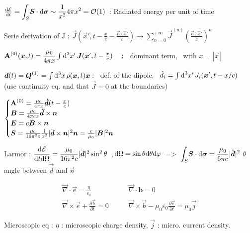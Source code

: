 \item $ \frac{\ud \E}{\ud t} = \displaystyle{\int_{S}} \vec{S}\cdot \vec{\ud \sigma} \sim \frac{1}{x^2}4\pi x^2 = \mathcal{O}(1)\, $ : Radiated energy per unit of time\\

\squishend 


\squishlist
\item Serie derivation of J : $ \vec{J}(\vec{x}', t - \frac{x}{c} - \frac{\vec{n}\cdot\vec{x}'}{c}) \rightarrow \sum_{n=0}^{+\infty} \vec{J}^{(n)} \left(\frac{\vec{n}\cdot\vec{x}'}{c}\right)^n$

\item $\vec{\rm{A}}^{(0)}(\vec{x},t) = \dfrac{\mu_0}{4\pi x} \int \ud ^3x' \, \vec{J}(\vec{x}', t-\frac{x}{c}) \quad :$ \,  dominant term, \, with $x = |\vec{x}|$

\item $\vec{d}(t) = \vec{Q}^{(1)} = \int \ud ^3x \, \rho(\vec{x},t)\vec{x}  :$ \, def. of the dipole, \, $\dot{d}_i = \int \ud ^3x' \, J_i(\vec{x}',t-x/c)$ \, (use continuity eq. and that $\vec{J}=0$ at the boundaries)

\item$        \begin{cases}
\vec{\rm{A}}^{(0)} = \frac{\mu_0}{4\pi x}{\vec{\dot{{d}}}}(t-\frac{x}{c}) \\
\vec{B} =\frac{\mu_0}{4\pi c x} \vec{\ddot{{d}}} \times \vec{n} \\
\vec{E} = c\vec{B} \times \vec{n}\\
\vec{S} = \frac{\mu_0}{16\pi^2c}\frac{1}{x^2} |\ddot{\vec{d}} \times \vec{n}|^2\vec{n} = \frac{c}{\mu_0} |\vec{B}|^2\vec{n}
\end{cases} $

\item Larmor : $\dfrac{\ud \E}{\ud t\ud \Omega} = \dfrac{\mu_0}{16\pi^2c}|\ddot{\vec{d}}|^2\sin^2\theta$ \,,$\,\ud \Omega = \sin\theta\ud \theta\ud \varphi \, $ => $\, \displaystyle{\int_{S}} \vec{S}\cdot\vec{\ud \sigma} = \dfrac{\mu_0}{6\pi c} |\ddot{\vec{d}}|^2$  $\theta$ angle between $ \vec{\ddot{d}}$ and $ \vec{n}$
\squishend

\squishlist
\item[] $$\boxed{\begin{split}
	\vec{\nabla}\cdot\vec{e} = \frac{\eta}{\varepsilon_0}  \qquad &\vec{\nabla} \cdot \boldsymbol{b} = 0\\
	\vec{\nabla}\times \vec{e} + \frac{\partial\vec{b}}{\partial t} =0 \qquad & \vec{\nabla} \times \vec{b} - \mu_0 \varepsilon_0 \frac{\partial \vec{e}}{\partial t} = \mu_0 \vec{j}
	\end{split}}$$
\item[] Microscopic eq : $\eta$ : microscopic charge density, $\vec{j}$ : micro. current density.

